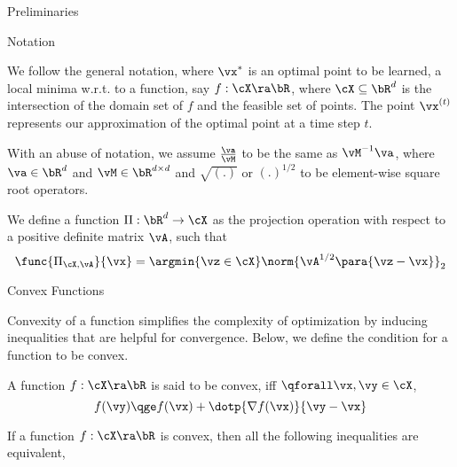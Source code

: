 \documentclass{article}
\newcommand{\x}[1]{\vx^{(#1)}}
\newcommand{\xs}{\vx^{\ast}}
\begin{document}
	\begin{psection}{Preliminaries}

		\begin{psubsection}{Notation}

			We follow the general notation, where $\xs$ is an optimal point to be learned, \ie a local minima w.r.t. to a function, say $f : \cX \ra \bR$, where $\cX \subseteq \bR^d$ is the intersection of the domain set of $f$ and the feasible set of points. The point $\x{t}$ represents our approximation of the optimal point at a time step $t$.

			With an abuse of notation, we assume $\frac{\va}{\vM}$ to be the same as $\vM^{-1} \va$, where $\va \in \bR^d$ and $\vM \in \bR^{d \times d}$ and $\sqrt{(.)}$ or $(.)^{1/2}$ to be element-wise square root operators.

			We define a function $\Pi: \bR^d \to \cX$ as the projection operation with respect to a positive definite matrix $\vA$, such that
			\begin{equation}
				\func{\Pi_{\cX, \vA}}{\vx} = \argmin{\vz \in \cX} \norm{\vA^{1/2} \para{\vz - \vx}}_{2}
				\label{eq:pi}
			\end{equation}

		\end{psubsection}

		\begin{psubsection}{Convex Functions}

			Convexity of a function simplifies the complexity of optimization by inducing inequalities that are helpful for convergence. Below, we define the condition for a function to be convex.
			\begin{definition}
				\label{def:cvx}
				A function $f: \cX \ra \bR$ is said to be convex, iff $\qforall \vx, \vy \in \cX$,
				\begin{equation}
					f(\vy)	\qge	f(\vx) + \dotp{\nabla f(\vx)}{\vy - \vx}
					\label{eq:cvx}
				\end{equation}
			\end{definition}

			If a function $f : \cX \ra \bR$ is convex, then all the following inequalities are equivalent,


\end{psubsection}
\end{psection}
\end{document}
